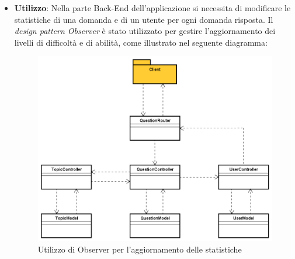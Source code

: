 \begin{itemize}
\item \textbf{Utilizzo}: Nella parte Back-End dell'applicazione si necessita di modificare le statistiche di una domanda e di un utente per ogni domanda risposta. Il \textit{design pattern Observer} è stato utilizzato per gestire l'aggiornamento dei livelli di difficoltà e di abilità, come illustrato nel seguente diagramma:
\label{Utilizzo di Observer per l'aggionramento delle statistiche}
\begin{figure} [ht]
	\centering
	\includegraphics[scale=0.50]{UML/strutturaPattern/ObserverUtilizzo.png}
	\caption{Utilizzo di Observer per l'aggiornamento delle statistiche}
\end{figure}\FloatBarrier
\end{itemize}